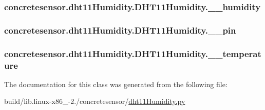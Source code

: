 \subsubsection[{\+\_\+\+\_\+humidity}]{\setlength{\rightskip}{0pt plus 5cm}concretesensor.\+dht11\+Humidity.\+D\+H\+T11\+Humidity.\+\_\+\+\_\+humidity\hspace{0.3cm}{\ttfamily [private]}}\label{classconcretesensor_1_1dht11Humidity_1_1DHT11Humidity_aa19e5a6e74922fcb3ade70294bd35119}
\hypertarget{classconcretesensor_1_1dht11Humidity_1_1DHT11Humidity_ae8ab5b492fdf2654ddba2a4041f63d35}{}
\subsubsection[{\+\_\+\+\_\+pin}]{\setlength{\rightskip}{0pt plus 5cm}concretesensor.\+dht11\+Humidity.\+D\+H\+T11\+Humidity.\+\_\+\+\_\+pin\hspace{0.3cm}{\ttfamily [private]}}\label{classconcretesensor_1_1dht11Humidity_1_1DHT11Humidity_ae8ab5b492fdf2654ddba2a4041f63d35}
\hypertarget{classconcretesensor_1_1dht11Humidity_1_1DHT11Humidity_ac436f02506e53f174b3e943952fefce0}{}
\subsubsection[{\+\_\+\+\_\+temperature}]{\setlength{\rightskip}{0pt plus 5cm}concretesensor.\+dht11\+Humidity.\+D\+H\+T11\+Humidity.\+\_\+\+\_\+temperature\hspace{0.3cm}{\ttfamily [private]}}\label{classconcretesensor_1_1dht11Humidity_1_1DHT11Humidity_ac436f02506e53f174b3e943952fefce0}


The documentation for this class was generated from the following file\+:\begin{DoxyCompactItemize}
\item 
build/lib.\+linux-\/x86\+\_-\/2./concretesensor/\hyperlink{build_2lib_8linux-x86__64-2_87_2concretesensor_2dht11Humidity_8py}{dht11\+Humidity.\+py}\end{DoxyCompactItemize}
